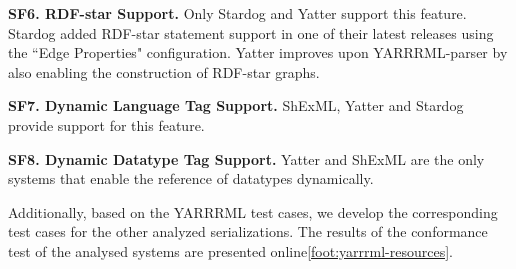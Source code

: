 \textbf{SF6. RDF-star Support.}
Only Stardog and Yatter support this feature. 
Stardog added RDF-star statement support in one of their latest releases using the ``Edge Properties" configuration.
Yatter improves upon YARRRML-parser by also enabling the construction of RDF-star graphs.

\textbf{SF7. Dynamic Language Tag Support.} %
ShExML, Yatter and Stardog 
 provide support for this feature. 

\textbf{SF8. Dynamic Datatype Tag Support.} %
Yatter and ShExML are the only systems that enable the reference of datatypes dynamically. 

Additionally, based on the YARRRML test cases, we develop the corresponding test cases for the other analyzed serializations. The results of the conformance test of the analysed systems are presented online\cref{foot:yarrrml-resources}.


